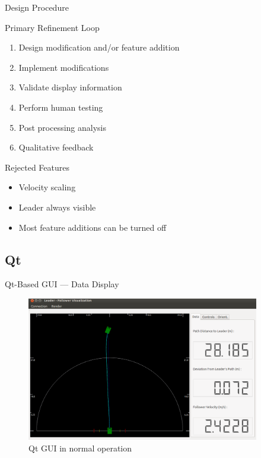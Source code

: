 \documentclass{beamer}
\begin{document}
    \begin{frame}{Design Procedure}

      Primary Refinement Loop
      \begin{enumerate} \footnotesize
        \item Design modification and/or feature addition
        \item Implement modifications
        \item Validate display information
        \item Perform human testing
        \item Post processing analysis
        \item Qualitative feedback
      \end{enumerate}        

      Rejected Features
      \begin{itemize}
        \item Velocity scaling
        \item Leader always visible
        \item Most feature additions can be turned off
      \end{itemize}
      

    \end{frame}

  \subsection{Qt}

    \begin{frame}{Qt-Based GUI --- Data Display}
      \begin{figure}[ht] \centering
        \includegraphics[width=4in] {../graphics/final_design_data.png}
        \caption{Qt GUI in normal operation} \label{fig:qt_data_display}
      \end{figure}
    \end{frame}
\end{document}
